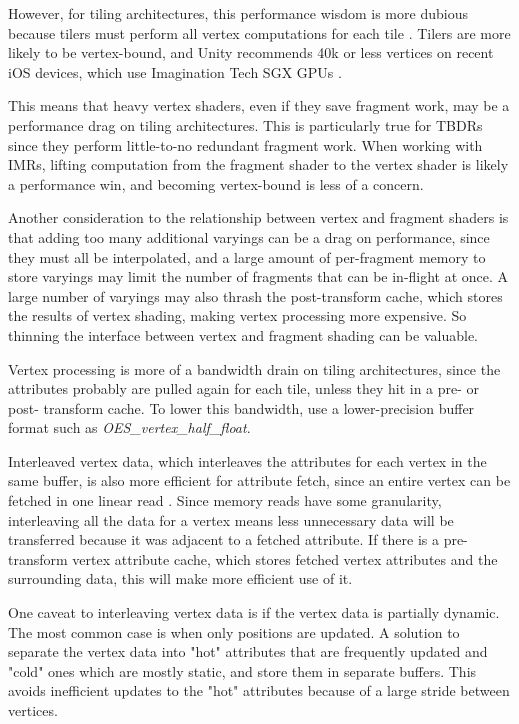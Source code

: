 However, for tiling architectures, this performance wisdom is more dubious because tilers
must perform
 all vertex computations for each tile \cite{Apple11}.  Tilers
are more likely to
 be vertex-bound, and Unity recommends 40k or less vertices
on recent iOS
 devices, which use Imagination Tech SGX GPUs \cite{Unity11}.

This means that heavy vertex shaders, even if they save fragment work, may be
a
 performance drag on tiling architectures.  This is particularly true for
TBDRs since they perform
 little-to-no redundant fragment work.  When working
with IMRs, lifting
 computation from the fragment shader to the vertex shader
is likely a
 performance win, and becoming vertex-bound is less of a concern.

Another consideration to the relationship between vertex and fragment shaders
is that adding too many additional varyings can be a drag on performance, since
they must all be interpolated, and a large amount of per-fragment memory to store varyings may
limit the number of fragments that can be in-flight at once.  A large number of
varyings may also thrash the post-transform cache, which stores the results of
vertex shading, making vertex processing more expensive.  So thinning the
interface between vertex and fragment shading can be valuable.

Vertex processing is more of a bandwidth drain on tiling architectures, since
the attributes probably are pulled again for each tile, unless they hit in a
pre- or post- transform cache.  To lower this bandwidth, use a lower-precision
buffer format such as \textit{OES\_vertex\_half\_float}.

Interleaved vertex
 data, which interleaves the attributes for each vertex in
the same buffer, is
 also more efficient for attribute fetch, since an entire
vertex can be fetched
 in one linear read \cite{Apple11}.  Since memory reads
have some granularity, interleaving all the data for a vertex means less
unnecessary data will be transferred because it was adjacent to a fetched
attribute.  If there is a pre-transform vertex
 attribute cache, which stores
fetched vertex attributes and the surrounding
 data, this will make more
efficient use of it.

One caveat to interleaving vertex data is if the vertex data is partially
dynamic.  The most common case is when only positions are updated.  A solution
to separate the vertex data into "hot" attributes that are frequently updated
and "cold" ones which are mostly static, and store them in separate buffers.
This avoids inefficient updates to the "hot" attributes because of a large
stride between vertices.

